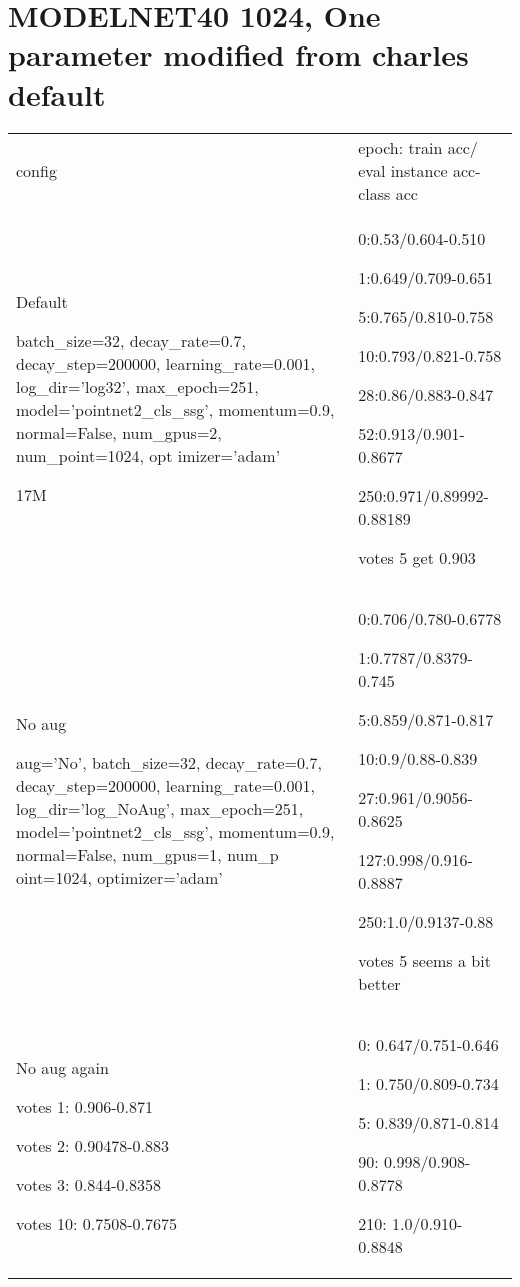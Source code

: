 \documentclass[,table,dvipsnames]{article}
\begin{document}
\section{MODELNET40 1024, One parameter modified from charles default}
\noindent\begin{tabular}{|p{10cm}|p{5.5cm}| }	
	\hline
	
	config & epoch: train acc/ eval instance acc-class acc\\
	
	\rowcolor{green!20}
	Default\par 
	batch\_size=32, decay\_rate=0.7, decay\_step=200000, learning\_rate=0.001, log\_dir='log32', max\_epoch=251, model='pointnet2\_cls\_ssg', momentum=0.9, normal=False, num\_gpus=2, num\_point=1024, opt     imizer='adam' \par 17M&
	0:0.53/0.604-0.510\par 1:0.649/0.709-0.651\par 5:0.765/0.810-0.758\par 10:0.793/0.821-0.758\par 28:0.86/0.883-0.847\par 52:0.913/0.901-0.8677\par 250:0.971/0.89992-0.88189\par votes 5 get 0.903\\
	
	\rowcolor{yellow!20}
	No aug\par
	aug='No', batch\_size=32, decay\_rate=0.7, decay\_step=200000, learning\_rate=0.001, log\_dir='log\_NoAug', max\_epoch=251, model='pointnet2\_cls\_ssg', momentum=0.9, normal=False, num\_gpus=1, num\_p     oint=1024, optimizer='adam' & 0:0.706/0.780-0.6778\par 1:0.7787/0.8379-0.745\par 5:0.859/0.871-0.817\par 10:0.9/0.88-0.839 \par 27:0.961/0.9056-0.8625\par 127:0.998/0.916-0.8887\par 250:1.0/0.9137-0.88\par votes 5 seems a bit better\\	

	\rowcolor{orange!20}
	No aug again\par
	votes 1: 0.906-0.871\par votes 2: 0.90478-0.883\par votes 3: 0.844-0.8358\par votes 10: 0.7508-0.7675
	&0: 0.647/0.751-0.646\par 1: 0.750/0.809-0.734\par 5: 0.839/0.871-0.814\par 90: 0.998/0.908-0.8778\par 210: 1.0/0.910-0.8848
	\\


\end{tabular}
\end{document}

